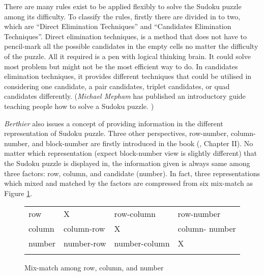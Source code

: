 \documentclass[11pt]{report}
\begin{document}
There are many rules exist to be applied flexibly to solve the Sudoku puzzle among its difficulty. To classify the rules, firstly there are divided in to two, which are ``Direct Elimination Techniques'' and ``Candidates Elimination Techniques''. Direct elimination techniques, is a method that does not have to pencil-mark all the possible candidates in the empty cells no matter the difficulty of the puzzle. All it required is a pen with logical thinking brain. It could solve most problem but might not be the most efficient way to do. In candidates elimination techniques, it provides different techniques that could be utilised in considering one candidate, a pair candidates, triplet candidates, or quad candidates differently. (\emph{Michael Mepham} has published an introductory guide teaching people how to solve a Sudoku puzzle. \cite{Mepham2005Solving})

\emph{Berthier} also issues a concept of providing information in the different representation of Sudoku puzzle. Three other perspectives, row-number, column-number, and block-number are firstly introduced in the book (\cite{Berthier2007Sudoku}, Chapter II). No matter which representation (expect block-number view is slightly different) that the Sudoku puzzle is displayed in, the information given is always same among three factors: row, column, and candidate (number). In fact, three representations which mixed and matched by the factors are compressed from six mix-match as Figure \ref{fig:mixmatch}.

\begin{figure}[h]
\setlength{\tabcolsep}{3pt}
\renewcommand{\arraystretch}{2}
\begin{center}
\begin{tabular}{ >{\centering\arraybackslash}m{0.6in}|| >{\centering\arraybackslash}m{1.2in}|| >{\centering\arraybackslash}m{1.2in}|| >{\centering\arraybackslash}m{1.2in}||}
\multicolumn{1}{c}{} & \multicolumn{1}{c}{row} & \multicolumn{1}{c}{column} & \multicolumn{1}{c}{number}\\ \cline{2-4}
row & X & row-column & row-number\\ \cline{2-4}
column & column-row \cellcolor[gray]{.8}& X& column- number\\ \cline{2-4}
number & number-row \cellcolor[gray]{.8}& number-column \cellcolor[gray]{.8}& X\\ \cline{2-4}
\end{tabular}
\end{center}
\caption{Mix-match among row, column, and number}
\label{fig:mixmatch}
\end{figure}
\end{document}
